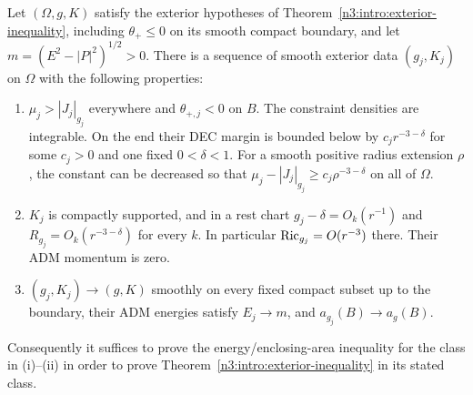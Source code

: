 \begin{proposition}
\label{n3:reduction:rest-reduction}
Let $(\Omega,g,K)$ satisfy the exterior hypotheses of
Theorem~\ref{n3:intro:exterior-inequality}, including $\theta_+\le0$ on its
smooth compact boundary, and let $m=(E^2-|P|^2)^{1/2}>0$.
There is a sequence of smooth exterior data $(g_j,K_j)$ on $\Omega$ with the
following properties:
\begin{enumerate}[label=\textup{(\roman*)}]
\item $\mu_j>|J_j|_{g_j}$ everywhere and $\theta_{+,j}<0$ on $B$.
      The constraint densities are integrable.  On the end their DEC
      margin is bounded below by $c_jr^{-3-\delta}$ for some $c_j>0$
      and one fixed $0<\delta<1$. For a smooth positive radius extension
      $\rho$, the constant can be decreased so that
      $\mu_j-|J_j|_{g_j}\ge c_j\rho^{-3-\delta}$ on all of $\Omega$.
\item $K_j$ is compactly supported, and in a rest chart
      $g_j-\delta=O_k(r^{-1})$ and $R_{g_j}=O_k(r^{-3-\delta})$
      for every $k$.  In particular
      $\operatorname{Ric}_{g_j}=O(r^{-3})$ there.  Their ADM momentum is zero.
\item $(g_j,K_j)\to(g,K)$ smoothly on every fixed compact subset up to
      the boundary, their ADM energies satisfy $E_j\to m$, and
      $a_{g_j}(B)\to a_g(B)$.
\end{enumerate}
Consequently it suffices to prove the energy/enclosing-area inequality
for the class in \textup{(i)}--\textup{(ii)} in order to prove
Theorem~\ref{n3:intro:exterior-inequality} in its stated class.
\end{proposition}

